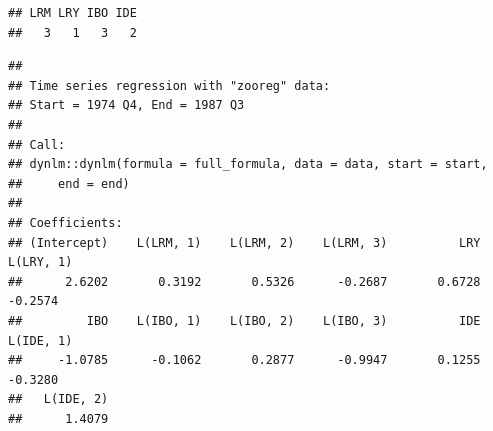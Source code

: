 \documentclass[
]{book}
\newenvironment{Shaded}{\begin{snugshade}}{\end{snugshade}}
\newcommand{\CommentTok}[1]{\textcolor[rgb]{0.56,0.35,0.01}{\textit{#1}}}
\newcommand{\FunctionTok}[1]{\textcolor[rgb]{0.13,0.29,0.53}{\textbf{#1}}}
\newcommand{\NormalTok}[1]{#1}
\newcommand{\OtherTok}[1]{\textcolor[rgb]{0.56,0.35,0.01}{#1}}
\newcommand{\SpecialCharTok}[1]{\textcolor[rgb]{0.81,0.36,0.00}{\textbf{#1}}}
\begin{document}
\begin{Shaded}
\end{Shaded}

\begin{verbatim}
## LRM LRY IBO IDE 
##   3   1   3   2
\end{verbatim}

\begin{Shaded}
\end{Shaded}

\begin{verbatim}
## 
## Time series regression with "zooreg" data:
## Start = 1974 Q4, End = 1987 Q3
## 
## Call:
## dynlm::dynlm(formula = full_formula, data = data, start = start, 
##     end = end)
## 
## Coefficients:
## (Intercept)    L(LRM, 1)    L(LRM, 2)    L(LRM, 3)          LRY    L(LRY, 1)  
##      2.6202       0.3192       0.5326      -0.2687       0.6728      -0.2574  
##         IBO    L(IBO, 1)    L(IBO, 2)    L(IBO, 3)          IDE    L(IDE, 1)  
##     -1.0785      -0.1062       0.2877      -0.9947       0.1255      -0.3280  
##   L(IDE, 2)  
##      1.4079
\end{verbatim}

\begin{Shaded}
\end{Shaded}
\end{document}
